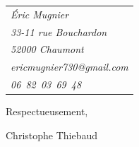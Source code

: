 \documentclass[11pt,a4paper]{article}
\begin{document}
\vspace{6mm}


\smallskip
\noindent\begin{tabular}{@{}>{\itshape}l@{}}
Éric Mugnier\\
33-11 rue Bouchardon\\
52000 Chaumont\\
ericmugnier730@gmail.com\\
06~82~03~69~48\\
\end{tabular}


\vspace{8mm}

Respectueusement,

\vspace{5mm}
\noindent Christophe Thiebaud
\end{document}
